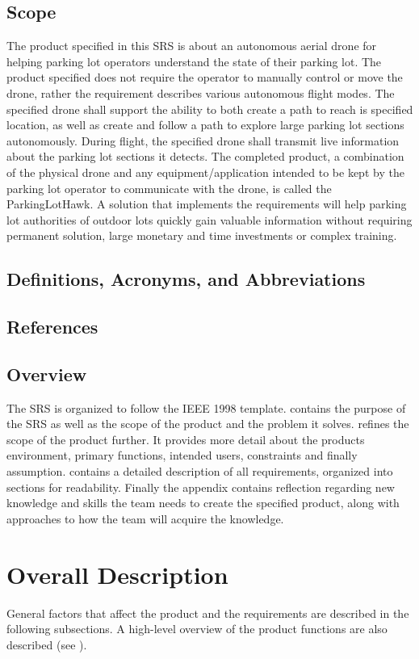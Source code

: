 \documentclass{article}
\begin{document}
\subsection{Scope}
The product specified in this SRS is about an autonomous aerial drone for helping parking lot operators understand the state of their parking lot. The product specified does not require the operator to manually control or move the drone, rather the requirement describes various autonomous flight modes. The specified drone shall support the ability to both create a path to reach is specified location, as well as create and follow a path to explore large parking lot sections autonomously. During flight, the specified drone shall transmit live information about the parking lot sections it detects. The completed product, a combination of the physical drone and any equipment/application intended to be kept by the parking lot operator to communicate with the drone, is called the ParkingLotHawk. A solution that implements the requirements will help parking lot authorities of outdoor lots quickly gain valuable information without requiring permanent solution, large monetary and time investments or complex training. 



\subsection{Definitions, Acronyms, and Abbreviations}
\subsection{References}
\subsection{Overview}
The SRS is organized to follow the IEEE 1998 template.  contains the purpose of the SRS as well as the scope of the product and the problem it solves.   refines the scope of the product further. It provides more detail about the products environment, primary functions, intended users, constraints and finally assumption.  contains a detailed description of all requirements, organized into sections for readability. Finally the appendix contains reflection regarding new knowledge and skills the team needs to create the specified product, along with approaches to how the team will acquire the knowledge. 
\section{Overall Description}
\label{sec:Desc}
General factors that affect the product and the requirements are described in the following subsections. A high-level overview of the product functions are also described (see ). 
\end{document}

